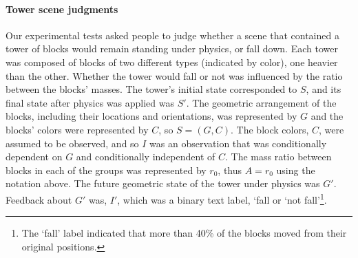 \documentclass[10pt,letterpaper]{article}
\begin{document}
\paragraph{Tower scene judgments}
Our experimental tests asked people to judge whether a scene that
contained a tower of blocks would remain standing under physics, or
fall down. Each tower was composed of blocks of two different types
(indicated by color), one heavier than the other. Whether the tower
would fall or not was influenced by the ratio between the blocks'
masses. The tower's initial state corresponded to $S$, and its final
state after physics was applied was $S'$. The geometric arrangement of
the blocks, including their locations and orientations, was
represented by $G$ and the blocks' colors were represented by $C$, so
$S=(G,C)$. The block colors, $C$, were assumed to be observed, and so
$I$ was an observation that was conditionally dependent on $G$ and
conditionally independent of $C$. The mass ratio between blocks in
each of the groups was represented by $r_0$, thus $A=r_0$ using the
notation above. The future geometric state of the tower under physics
was $G'$. Feedback about $G'$ was, $I'$, which was a binary text
label, `fall or `not fall'\footnote{The `fall' label indicated that
  more than 40\% of the blocks moved from their original
  positions.}. %
              
\end{document}
